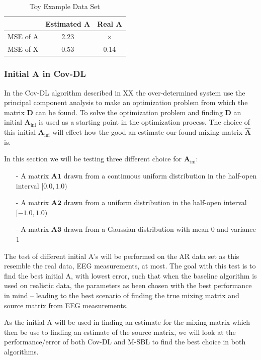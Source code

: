 \begin{table}[H]
\centering
\begin{tabular}{|c|c|c|}
\hline
         & Estimated A & Real A \\ \hline
MSE of A & 2.23 & $\times$ \\ 
\hline 
MSE of X & 0.53 & 0.14 \\ 
\hline
\end{tabular} 
\caption{Toy Example Data Set}
\end{table}

\subsubsection{Initial A in Cov-DL}
In the Cov-DL algorithm described in XX the over-determined system use the principal component analysis to make an optimization problem from which the matrix $\mathbf{D}$ can be found. To solve the optimization problem and finding $\mathbf{D}$ an initial $\mathbf{A}_{\text{ini}}$ is used as a starting point in the optimization process. The choice of this initial $\mathbf{A}_{\text{ini}}$ will effect how the good an estimate our found mixing matrix $\hat{\mathbf{A}}$ is.

In this section we will be testing three different choice for $\mathbf{A}_{\text{ini}}$:
\begin{itemize}
\item[-] A matrix $\mathbf{A1}$ drawn from a continuous uniform distribution in the half-open interval $[0.0, 1.0)$
\item[-] A matrix $\mathbf{A2}$ drawn from a uniform distribution in the half-open interval $[-1.0, 1.0)$
\item[-] A matrix $\mathbf{A3}$ drawn from a Gaussian distribution with mean 0 and variance 1
\end{itemize}
The test of different initial A's will be performed on the AR data set as this resemble the real data, EEG measurements, at most. The goal with this test is to find the best initial A, with lowest error, such that when the baseline algorithm is used on realistic data, the parameters as been chosen with the best performance in mind -- leading to the best scenario of finding the true mixing matrix and source matrix from EEG measurements.

As the initial A will be used in finding an estimate for the mixing matrix which then be use to finding an estimate of the source matrix, we will look at the performance/error of both Cov-DL and M-SBL to find the best choice in both algorithms.

